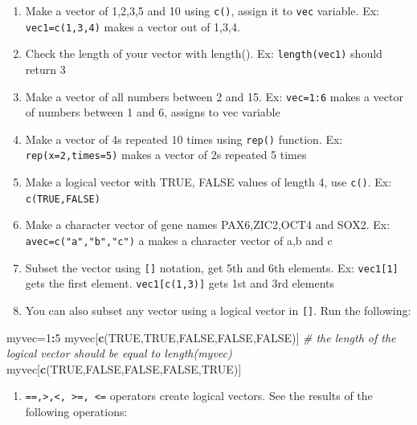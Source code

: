 \documentclass[12pt,]{krantz}
\newenvironment{Shaded}{\begin{snugshade}}{\end{snugshade}}
\newcommand{\CommentTok}[1]{\textcolor[rgb]{0.56,0.35,0.01}{\textit{#1}}}
\newcommand{\DecValTok}[1]{\textcolor[rgb]{0.00,0.00,0.81}{#1}}
\newcommand{\KeywordTok}[1]{\textcolor[rgb]{0.13,0.29,0.53}{\textbf{#1}}}
\newcommand{\NormalTok}[1]{#1}
\newcommand{\OperatorTok}[1]{\textcolor[rgb]{0.81,0.36,0.00}{\textbf{#1}}}
\newcommand{\OtherTok}[1]{\textcolor[rgb]{0.56,0.35,0.01}{#1}}
\providecommand{\tightlist}{%
  \setlength{\itemsep}{0pt}\setlength{\parskip}{0pt}}
\begin{document}
\begin{enumerate}
\def\labelenumi{\arabic{enumi}.}
\setcounter{enumi}{9}
\item
  Make a vector of 1,2,3,5 and 10 using \texttt{c()}, assign it to \texttt{vec} variable.
  Ex: \texttt{vec1=c(1,3,4)} makes a vector out of 1,3,4.
\item
  Check the length of your vector with length().
  Ex: \texttt{length(vec1)} should return 3
\item
  Make a vector of all numbers between 2 and 15.
  Ex: \texttt{vec=1:6} makes a vector of numbers between 1 and 6, assigns to vec variable
\item
  Make a vector of 4s repeated 10 times using \texttt{rep()} function. Ex: \texttt{rep(x=2,times=5)} makes a vector of 2s repeated 5 times
\item
  Make a logical vector with TRUE, FALSE values of length 4, use \texttt{c()}.
  Ex: \texttt{c(TRUE,FALSE)}
\item
  Make a character vector of gene names PAX6,ZIC2,OCT4 and SOX2.
  Ex: \texttt{avec=c("a","b","c")} a makes a character vector of a,b and c
\item
  Subset the vector using \texttt{{[}{]}} notation, get 5th and 6th elements.
  Ex: \texttt{vec1{[}1{]}} gets the first element. \texttt{vec1{[}c(1,3){]}} gets 1st and 3rd elements
\item
  You can also subset any vector using a logical vector in \texttt{{[}{]}}. Run the following:
\end{enumerate}

\begin{Shaded}
\begin{Highlighting}[]
\NormalTok{myvec=}\DecValTok{1}\OperatorTok{:}\DecValTok{5}
\NormalTok{myvec[}\KeywordTok{c}\NormalTok{(}\OtherTok{TRUE}\NormalTok{,}\OtherTok{TRUE}\NormalTok{,}\OtherTok{FALSE}\NormalTok{,}\OtherTok{FALSE}\NormalTok{,}\OtherTok{FALSE}\NormalTok{)] }\CommentTok{# the length of the logical vector should be equal to length(myvec) }
\NormalTok{myvec[}\KeywordTok{c}\NormalTok{(}\OtherTok{TRUE}\NormalTok{,}\OtherTok{FALSE}\NormalTok{,}\OtherTok{FALSE}\NormalTok{,}\OtherTok{FALSE}\NormalTok{,}\OtherTok{TRUE}\NormalTok{)]}
\end{Highlighting}
\end{Shaded}

\begin{enumerate}
\def\labelenumi{\arabic{enumi}.}
\setcounter{enumi}{17}
\tightlist
\item
  \texttt{==,\textgreater{},\textless{},\ \textgreater{}=,\ \textless{}=} operators create logical vectors. See the results of the following operations:
\end{enumerate}
\end{document}
